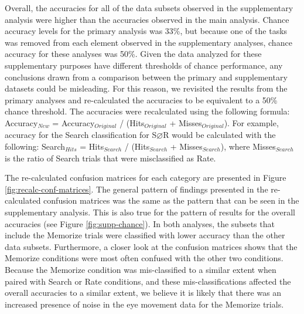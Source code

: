 \documentclass[
  english,
  man,floatsintext]{apa6}
\begin{document}
\begin{appendix}
Overall, the accuracies for all of the data subsets observed in the
supplementary analysis were higher than the accuracies observed in the
main analysis. Chance accuracy levels for the primary analysis was 33\%,
but because one of the tasks was removed from each element observed in
the supplementary analyses, chance accuracy for these analyses was 50\%.
Given the data analyzed for these supplementary purposes have different
thresholds of chance performance, any conclusions drawn from a
comparison between the primary and supplementary datasets could be
misleading. For this reason, we revisited the results from the primary
analyses and re-calculated the accuracies to be equivalent to a 50\%
chance threshold. The accuracies were recalculated using the following
formula: Accuracy\(_{New}\) = Accuracy\(_{Original}\) /
(Hits\(_{Original}\) + Misses\(_{Original}\)). For example, accuracy for
the Search classification for S\(\varnothing\)R would be calculated with
the following: Search\(_{Hits}\) = Hits\(_{Search}\) /
(Hits\(_{Search}\) + Misses\(_{Search}\)), where Misses\(_{Search}\) is
the ratio of Search trials that were misclassified as Rate.

The re-calculated confusion matrices for each category are presented in
Figure \ref{fig:recalc-conf-matrices}. The general pattern of findings
presented in the re-calculated confusion matrices was the same as the
pattern that can be seen in the supplementary analysis. This is also
true for the pattern of results for the overall accuracies (see Figure
\ref{fig:supp-chance}). In both analyses, the subsets that include the
Memorize trials were classified with lower accuracy than the other data
subsets. Furthermore, a closer look at the confusion matrices shows that
the Memorize conditions were most often confused with the other two
conditions. Because the Memorize condition was mis-classified to a
similar extent when paired with Search or Rate conditions, and these
mis-classifications affected the overall accuracies to a similar extent,
we believe it is likely that there was an increased presence of noise in
the eye movement data for the Memorize trials.


\end{appendix}
\end{document}
